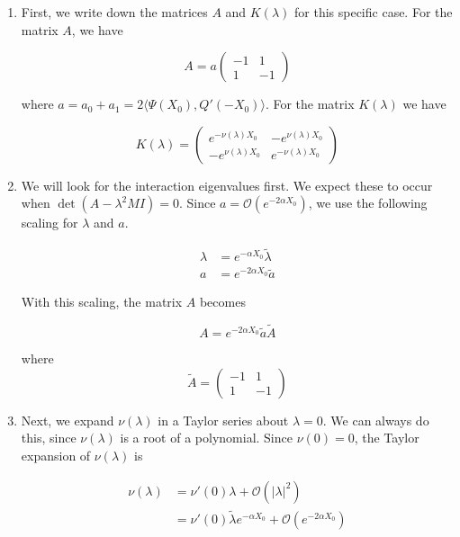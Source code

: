 \documentclass[12pt]{article}
\begin{document}
\begin{enumerate}

\item First, we write down the matrices $A$ and $K(\lambda)$ for this specific case. For the matrix $A$, we have

\[
A = a \begin{pmatrix}
-1 & 1 \\
1 & -1
\end{pmatrix}
\]

where $a = a_0 + a_1 = 2 \langle \Psi(X_0), Q'(-X_0) \rangle$. For the matrix $K(\lambda)$ we have

\begin{equation}
K(\lambda) = 
\begin{pmatrix}
e^{-\nu(\lambda)X_0} & -e^{\nu(\lambda)X_0} \\
-e^{\nu(\lambda)X_0} & e^{-\nu(\lambda)X_0}
\end{pmatrix}
\end{equation}

\item We will look for the interaction eigenvalues first. We expect these to occur when $\det(A - \lambda^2 M I) = 0$. Since $a = \mathcal{O}(e^{-2 \alpha X_0})$, we use the following scaling for $\lambda$ and $a$.

\begin{align*}
\lambda &= e^{-\alpha X_0} \tilde{\lambda} \\
a &= e^{-2 \alpha X_0} \tilde{a}
\end{align*}

With this scaling, the matrix $A$ becomes 

\[
A = e^{-2\alpha X_0} \tilde{a} \tilde{A}
\]

where
\[
\tilde{A} = \begin{pmatrix}
-1 & 1 \\
1 & -1
\end{pmatrix}
\]

\item Next, we expand $\nu(\lambda)$ in a Taylor series about $\lambda = 0$. We can always do this, since $\nu(\lambda)$ is a root of a polynomial. Since $\nu(0) = 0$, the Taylor expansion of $\nu(\lambda)$ is 

\begin{align*}
\nu(\lambda) &= \nu'(0)\lambda + \mathcal{O}(|\lambda|^2) \\
&= \nu'(0)\tilde{\lambda}e^{-\alpha X_0} + \mathcal{O}(e^{-2 \alpha X_0})
\end{align*}


\end{enumerate}
\end{document}
